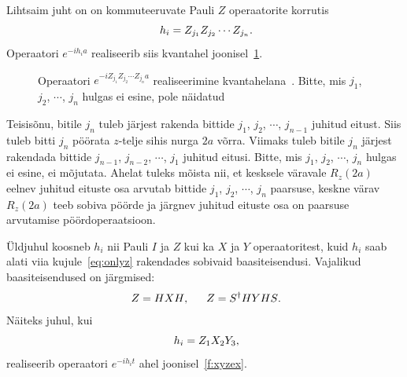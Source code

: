 \documentclass[12pt]{report}
\begin{document}
Lihtsaim juht on on kommuteeruvate Pauli \(Z\) operaatorite korrutis
\begin{equation}\label{eq:onlyz}
  h_i = Z_{j_1}Z_{j_2}\cdots Z_{j_n} \rlap{.}
\end{equation}
Operaatori \(e^{-i h_i a}\) realiseerib siis kvantahel joonisel~\ref{f:expz}.
\begin{figure}[h]
  \centering
  \ifdefined\yquanton
  \fi
  \caption{Operaatori \(e^{-iZ_{j_1}Z_{j_2}\cdots Z_{j_n}a}\) realiseerimine kvantahelana~\cite{mansky+etal, nielsen+chuang}. Bitte, mis \(j_1\), \(j_2\), \(\cdots\), \(j_n\) hulgas ei esine, pole näidatud}
  \label{f:expz}
\end{figure}
Teisisõnu, bitile \(j_n\) tuleb järjest rakenda bittide \(j_1\), \(j_2\), \(\cdots\), \(j_{n-1}\) juhitud eitust.
Siis tuleb bitti \(j_n\) pöörata \(z\)-telje sihis nurga \(2a\) võrra.
Viimaks tuleb bitile \(j_n\) järjest rakendada bittide \(j_{n-1}\), \(j_{n-2}\), \(\cdots\), \(j_1\) juhitud eitusi.
Bitte, mis \(j_1\), \(j_2\), \(\cdots\), \(j_n\) hulgas ei esine, ei mõjutata.
Ahelat tuleks mõista nii, et kesksele väravale \(R_z(2a)\) eelnev juhitud eituste osa arvutab bittide \(j_1\), \(j_2\), \(\cdots\), \(j_n\) paarsuse, keskne värav \(R_z(2a)\) teeb sobiva pöörde ja järgnev juhitud eituste osa on paarsuse arvutamise pöördoperaatsioon.

Üldjuhul koosneb \(h_i\) nii Pauli \(I\) ja \(Z\) kui ka \(X\) ja \(Y\) operaatoritest, kuid \(h_i\) saab alati viia kujule~\eqref{eq:onlyz} rakendades sobivaid baasiteisendusi.
Vajalikud baasiteisendused on järgmised:
\begin{align}
    Z = HXH \rlap{,}\qquad Z = S^\dagger HYHS \rlap{.}
\end{align}
Näiteks juhul, kui
\begin{equation}
  h_i = Z_1X_2Y_3 \rlap{,}
\end{equation}
realiseerib operaatori \(e^{-i h_i t}\) ahel joonisel~\ref{f:xyzex}.
\end{document}
